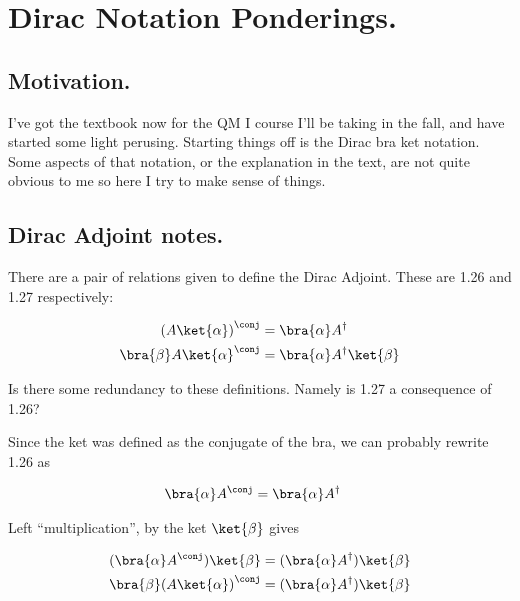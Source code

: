 
%

\chapter{Dirac Notation Ponderings.}
\label{chap:desaiDiracNotes}
{}
\date{July 23, 2010}

\beginArtNoToc

\section{Motivation.}

I've got the textbook \cite{desai2009quantum} now for the QM I course I'll be taking in the fall, and have started some light perusing.  Starting things off is the Dirac bra ket notation.  Some aspects of that notation, or the explanation in the text, are not quite obvious to me so here I try to make sense of things.

\section{Dirac Adjoint notes.}

There are a pair of relations given to define the Dirac Adjoint.  These are 1.26 and 1.27 respectively:

\begin{align*}
\left( A \ket{\alpha} \right)^\conj &= \bra{\alpha} A^\dagger \\
{\bra{\beta} A \ket{\alpha}}^\conj &= \bra{\alpha} A^\dagger \ket{\beta}
\end{align*}

Is there some redundancy to these definitions.  Namely is 1.27 a consequence of 1.26?

Since the ket was defined as the conjugate of the bra, we can probably rewrite 1.26 as

\begin{align*}
\bra{\alpha} A^\conj &= \bra{\alpha} A^\dagger 
\end{align*}

Left ``multiplication'', by the ket $\ket{\beta}$ gives

\begin{align*}
(\bra{\alpha} A^\conj) \ket{\beta} &= (\bra{\alpha} A^\dagger) \ket{\beta} \\
{\bra{\beta} (A \ket{\alpha})}^\conj &= (\bra{\alpha} A^\dagger) \ket{\beta} \\
\end{align*}

